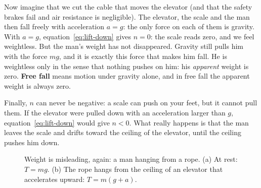 \documentclass[11pt,a4paper]{article}
\begin{document}
Now imagine that we cut the cable that moves the elevator (and that the safety brakes fail and air
resistance is negligible). The elevator, the scale and the man then fall freely with acceleration
$a = g$: the only force on each of them is gravity. With $a = g$, equation~\eqref{eq:lift-down}
gives $n = 0$: the scale reads zero, and we feel weightless. But the man's weight has not
disappeared. Gravity still pulls him with the force $mg$, and it is exactly this force that makes him
fall. He is weightless only in the sense that nothing pushes on him: his \emph{apparent} weight is
zero. \textbf{Free fall} means motion under gravity alone, and in free fall the apparent weight is
always zero.

Finally, $n$ can never be negative: a scale can push on your feet, but it cannot pull them. If the
elevator were pulled down with an acceleration larger than $g$, equation~\eqref{eq:lift-down}
would give $n < 0$. What really happens is that the man leaves the scale and drifts toward the
ceiling of the elevator, until the ceiling pushes him down.

\begin{figure}[ht]
\centering
{}
\caption{Weight is misleading, again: a man hanging from a rope. (a) At rest: $T = mg$. (b) The rope
hangs from the ceiling of an elevator that accelerates upward: $T = m(g+a)$.}
\label{fig:rope}
\end{figure}
\end{document}
